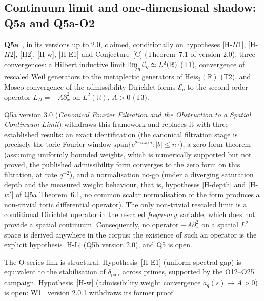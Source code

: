 \documentclass[11pt,a4paper]{article}
\theoremstyle{definition}
\newcommand{\Heis}{\mathrm{Heis}}
\newcommand{\Lpi}{L_\Pi}
\begin{document}
    \subsection{Continuum limit and one-dimensional shadow: Q5a and Q5a-O2}
      \label{sec:q5a}

      \textbf{Q5a}~\cite{Beau2026q5a}, in its versions up to 2.0, claimed, conditionally on
      hypotheses [H-$\Pi$1], [H-$\Pi$2], [H2], [H-w], [H-E1] and Conjecture~[C] (Theorem~7.1 of
      version 2.0), three convergences: a Hilbert
      inductive limit $\varinjlim_q \mathcal{C}_q \simeq L^2(\mathbb{R})$ (T1), convergence of
      rescaled Weil generators to the metaplectic generators of $\Heis_3(\mathbb{R})$ (T2), and
      Mosco convergence of the admissibility Dirichlet forms $\mathcal{E}_q$ to the
      second-order operator $\Lpi = -A\partial_x^2$ on $L^2(\mathbb{R})$, $A > 0$ (T3).

      Q5a version 3.0 (\emph{Canonical Fourier Filtration and the Obstruction to a Spatial
      Continuum Limit}) withdraws this framework and replaces it with three established
      results: an exact identification (the canonical filtration stage is precisely the toric
      Fourier window $\mathrm{span}\{e^{2\pi i b x/q} : |b| \le n\}$), a zero-form theorem
      (assuming uniformly bounded weights, which is numerically supported but not proved, the
      published admissibility form converges to the zero form on this filtration, at rate
      $q^{-2}$), and a normalisation no-go (under a diverging saturation depth and the measured
      weight behaviour, that is, hypotheses [H-depth] and [H-$w'$] of Q5a Theorem~6.1, no common
      scalar normalisation of the form produces a non-trivial toric differential operator).
      The only non-trivial rescaled limit is a conditional Dirichlet operator in the rescaled
      \emph{frequency} variable, which does not provide a spatial continuum.
      Consequently, no operator $-A\partial_x^2$ on a spatial $L^2$ space is derived anywhere
      in the corpus; the existence of such an operator is the explicit hypothesis [H-L]
      (Q5b version 2.0), and Q5 is open.

      The O-series link is structural: Hypothesis~[H-E1] (uniform spectral gap) is equivalent to the
      stabilisation of $\delta_{\mathrm{pair}}$ across primes, supported by the O12--O25 campaign.
      Hypothesis~[H-w] (admissibility weight convergence $a_q(s) \to A > 0$) is open:
      W1~\cite{Beau2026w1} version 2.0.1 withdraws its former proof.
\end{document}
